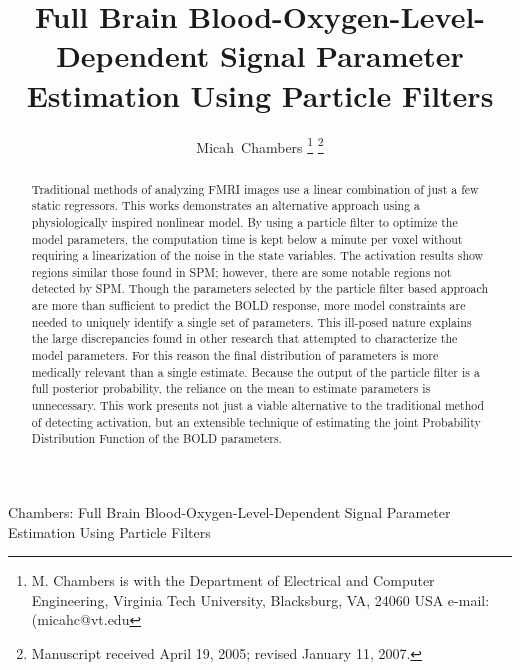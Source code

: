 \documentclass[journal]{./IEEEtran}
\begin{document}
\title{Full Brain Blood-Oxygen-Level-Dependent Signal Parameter Estimation Using Particle Filters}

\author{{Micah~Chambers}%
\thanks{M. Chambers is with the Department
of Electrical and Computer Engineering, Virginia Tech University, Blacksburg,
VA, 24060 USA e-mail: (micahc@vt.edu}%
\thanks{Manuscript received April 19, 2005; revised January 11, 2007.}}

%
{Chambers: Full Brain Blood-Oxygen-Level-Dependent Signal Parameter Estimation Using Particle Filters}
% 

\maketitle

\begin{abstract}
Traditional methods of analyzing FMRI images use a linear combination of
just a few static regressors. This works demonstrates an alternative
approach using a physiologically inspired nonlinear model. By using a 
particle filter to optimize the model parameters, the computation time
is kept below a minute per voxel without requiring a linearization 
of the noise in the state
variables. The activation results show regions similar those found in 
SPM; however, there are some notable regions not detected by 
SPM. Though the parameters selected by the particle filter based approach
are more than sufficient to predict the BOLD response,
more model constraints are needed to uniquely identify a single set
of parameters. This ill-posed nature explains the large discrepancies
found in other research that attempted to characterize the model parameters.
For this reason the final distribution of parameters is more medically relevant
than a single estimate. Because the output of the particle filter is 
a full posterior probability, the reliance on the mean to estimate 
parameters is unnecessary. This work presents
not just a viable alternative to the traditional method of detecting
activation, but an extensible technique of estimating the joint Probability
Distribution Function of the BOLD parameters.
\end{abstract}
\end{document}
